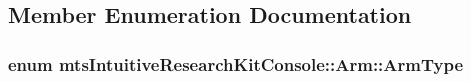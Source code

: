 \subsection{Member Enumeration Documentation}
\hypertarget{classmts_intuitive_research_kit_console_1_1_arm_acb898ba65d323f59ffd0885a47ef6cec}{
\subsubsection[{Arm\-Type}]{\setlength{\rightskip}{0pt plus 5cm}enum {\bf mts\-Intuitive\-Research\-Kit\-Console\-::\-Arm\-::\-Arm\-Type}}}\label{classmts_intuitive_research_kit_console_1_1_arm_acb898ba65d323f59ffd0885a47ef6cec}
